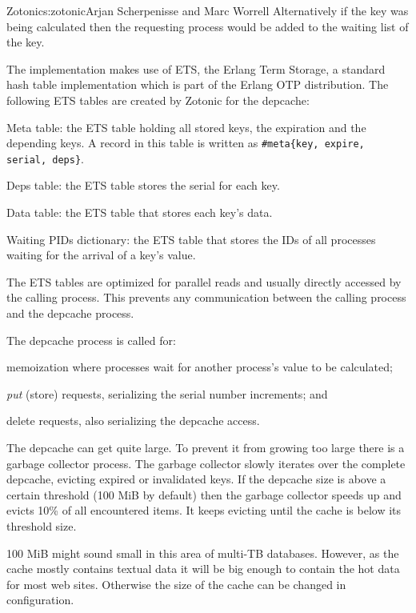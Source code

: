 \begin{aosachapter}{Zotonic}{s:zotonic}{Arjan Scherpenisse and Marc Worrell}
Alternatively if the key was being calculated then the requesting
process would be added to the waiting list of the key.

The implementation makes use of ETS, the Erlang Term Storage, a standard
hash table implementation which is part of the Erlang OTP distribution.
The following ETS tables are created by Zotonic for the depcache:

\begin{aosaitemize}

\item
  Meta table: the ETS table holding all stored keys, the expiration and
  the depending keys. A record in this table is written as
  \texttt{\#meta\{key, expire, serial, deps\}}.
\item
  Deps table: the ETS table stores the serial for each key.
\item
  Data table: the ETS table that stores each key's data.
\item
  Waiting PIDs dictionary: the ETS table that stores the IDs of all
  processes waiting for the arrival of a key's value.
\end{aosaitemize}

The ETS tables are optimized for parallel reads and usually directly
accessed by the calling process. This prevents any communication between
the calling process and the depcache process.

The depcache process is called for:

\begin{aosaitemize}

\item
  memoization where processes wait for another process's value to be
  calculated;
\item
  \emph{put} (store) requests, serializing the serial number increments;
  and
\item
  delete requests, also serializing the depcache access.
\end{aosaitemize}

The depcache can get quite large. To prevent it from growing too large
there is a garbage collector process. The garbage collector slowly
iterates over the complete depcache, evicting expired or invalidated
keys. If the depcache size is above a certain threshold (100 MiB by
default) then the garbage collector speeds up and evicts 10\% of all
encountered items. It keeps evicting until the cache is below its
threshold size.

100 MiB might sound small in this area of multi-TB databases. However,
as the cache mostly contains textual data it will be big enough to
contain the hot data for most web sites. Otherwise the size of the cache
can be changed in configuration.


\end{aosachapter}
